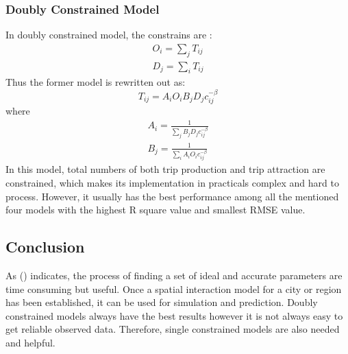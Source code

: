 \documentclass[a4paper,reqno,]{article}
\begin{document}
\subsubsection{Doubly Constrained Model}
\label{sssec:double models}
In doubly constrained model, the constrains are :
\begin{equation}
\begin{split}
O_i=\sum_{j}T_{ij}  \\
D_j=\sum_{i}T_{ij} 
\end{split}
\end{equation}
Thus the former model is rewritten out as:
\begin{equation}
T_{ij}=A_i O_i B_j D_jc_{ij}^{-\beta}
\end{equation}
where 
\begin{equation}
\begin{split}
A_i=\frac{1}{\sum_{j}{B_j D_j c_{ij}^{-\beta}}}\\
B_j=\frac{1}{\sum_{i}{A_i O_i c_{ij}^{-\beta}}}
\end{split}
\end{equation}
In this model, total numbers of both trip production and trip attraction are constrained, which makes its implementation in practicals complex and hard to process. However, it usually has the best performance among all the mentioned four models with the highest R square value and smallest RMSE value.
\subsection{Conclusion}
As \citeauthor{rodrigue2016geography} (\citeyear{rodrigue2016geography}) indicates, the process of finding a set of ideal and accurate parameters are time consuming but useful. Once a spatial interaction model for a city or region has been established, it can be used for simulation and prediction. Doubly constrained models always have the best results however it is not always easy to get reliable observed data. Therefore, single constrained models are also needed and helpful.
\newpage
\raggedright
\nocite{*}
\printbibliography
\end{document}
